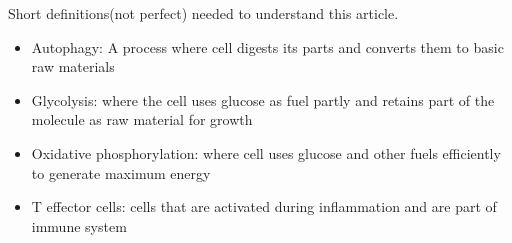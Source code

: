 Short definitions(not perfect) needed to understand this article.
\begin{itemize}
\item Autophagy: A process where cell digests its parts and converts them to basic raw materials
\end{itemize}
\begin{itemize}
\item Glycolysis: where the cell uses glucose as fuel partly and retains part of the molecule as raw material for growth
\end{itemize}
\begin{itemize}
\item Oxidative phosphorylation: where cell uses glucose and other fuels efficiently to generate maximum energy
\end{itemize}
\begin{itemize}
\item T effector cells: cells that are activated during inflammation and are part of immune system
\end{itemize}